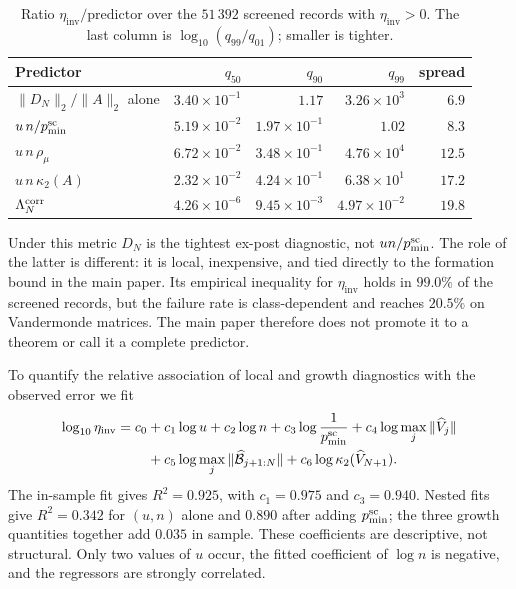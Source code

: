 \documentclass[supplement,review,onefignum,onetabnum]{siamart251216}
\begin{document}
\begin{table}
\centering
\caption{Ratio $\eta_{\mathrm{inv}}/\text{predictor}$ over the $51\,392$ screened records with
$\eta_{\mathrm{inv}}>0$. The last column is $\log_{10}(q_{99}/q_{01})$; smaller is tighter.}
\label{tab:sm-predictors}
\begin{tabular}{lrrrr}
\hline
Predictor & $q_{50}$ & $q_{90}$ & $q_{99}$ & spread \\
\hline
$\|D_N\|_2/\|A\|_2$ alone     & $3.40\times10^{-1}$ & $1.17$ & $3.26\times10^{3}$ & $6.9$ \\
$u\,n/p^{\rm sc}_{\min}$      & $5.19\times10^{-2}$ & $1.97\times10^{-1}$ & $1.02$ & $8.3$ \\
$u\,n\,\rho_\mu$              & $6.72\times10^{-2}$ & $3.48\times10^{-1}$ & $4.76\times10^{4}$ & $12.5$ \\
$u\,n\,\kappa_2(A)$           & $2.32\times10^{-2}$ & $4.24\times10^{-1}$ & $6.38\times10^{1}$ & $17.2$ \\
$\Lambda_N^{\rm corr}$        & $4.26\times10^{-6}$ & $9.45\times10^{-3}$ & $4.97\times10^{-2}$ & $19.8$ \\
\hline
\end{tabular}
\end{table}

Under this metric $D_N$ is the tightest ex-post diagnostic, not
$un/p^{\rm sc}_{\min}$. The role of the latter is different: it is local, inexpensive, and tied
directly to the formation bound in the main paper. Its empirical inequality for
$\eta_{\mathrm{inv}}$ holds in $99.0\%$ of the screened records, but the failure rate is
class-dependent and reaches $20.5\%$ on Vandermonde matrices. The main paper therefore does not
promote it to a theorem or call it a complete predictor.

To quantify the relative association of local and growth diagnostics with the observed error we
fit
%
\begin{equation}\label{eq:sm-regression}
\begin{aligned}
\log_{10}\eta_{\mathrm{inv}}=c_0
&+c_1\log u+c_2\log n+c_3\log\frac{1}{p^{\rm sc}_{\min}}
+c_4\log\max_j\|\widehat V_j\| \\
&+c_5\log\max_j\|\widehat{\mathcal B}_{j+1:N}\|
+c_6\log\kappa_2(\widehat V_{N+1}).
\end{aligned}
\end{equation}
%
The in-sample fit gives $R^2=0.925$, with $c_1=0.975$ and $c_3=0.940$. Nested fits give
$R^2=0.342$ for $(u,n)$ alone and $0.890$ after adding $p^{\rm sc}_{\min}$; the three growth
quantities together add $0.035$ in sample. These coefficients are descriptive, not structural.
Only two values of $u$ occur, the fitted coefficient of $\log n$ is negative, and the regressors
are strongly correlated.
\end{document}
